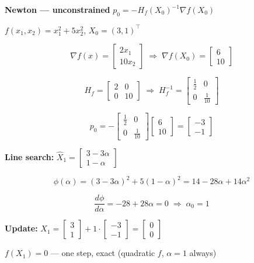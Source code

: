 \documentclass[10pt,a3paper]{article}
\begin{document}
\hfill
\begin{minipage}[t]{0.22\linewidth}
\textbf{Newton — unconstrained} \quad $p_0 = -H_f(X_0)^{-1}\nabla f(X_0)$

$f(x_1,x_2)=x_1^2+5x_2^2$,\; $X_0=(3,1)^\top$

\[
  \nabla f(x) = \begin{bmatrix}2x_1\\10x_2\end{bmatrix}
  \;\Rightarrow\;
  \nabla f(X_0) = \begin{bmatrix}6\\10\end{bmatrix}
\]

\[
  H_f = \begin{bmatrix}2&0\\0&10\end{bmatrix}
  \;\Rightarrow\;
  H_f^{-1} = \begin{bmatrix}\tfrac{1}{2}&0\\0&\tfrac{1}{10}\end{bmatrix}
\]

\[
  p_0 = -\begin{bmatrix}\tfrac{1}{2}&0\\0&\tfrac{1}{10}\end{bmatrix}
         \begin{bmatrix}6\\10\end{bmatrix}
       = \begin{bmatrix}-3\\-1\end{bmatrix}
\]

\textbf{Line search:} $\hat{X}_1 = \begin{bmatrix}3-3\alpha\\1-\alpha\end{bmatrix}$

\[
  \phi(\alpha) = (3-3\alpha)^2+5(1-\alpha)^2 = 14-28\alpha+14\alpha^2
\]

\[
  \frac{d\phi}{d\alpha}=-28+28\alpha=0 \;\Rightarrow\; \alpha_0=1
\]

\textbf{Update:} $ 
  X_1 = \begin{bmatrix}3\\1\end{bmatrix}+1\cdot\begin{bmatrix}-3\\-1\end{bmatrix}
      = \begin{bmatrix}0\\0\end{bmatrix}
$

$f(X_1)=0$ — one step, exact (quadratic $f$, $\alpha=1$ always)

\end{minipage}
\end{document}
